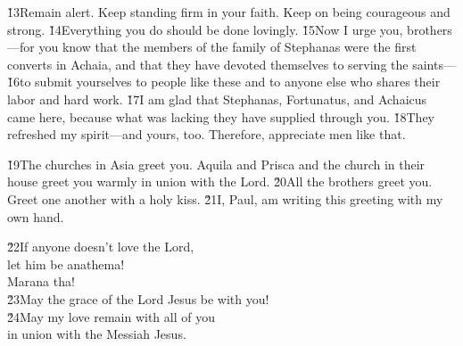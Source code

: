 \v{13}Remain alert. Keep standing firm in your faith. Keep on being courageous and strong. \v{14}Everything you do should be done lovingly. \v{15}Now I urge you, brothers---for you know that the members of the family of Stephanas were the first converts in Achaia, and that they have devoted themselves to serving the saints--- \v{16}to submit yourselves to people like these and to anyone else who shares their labor and hard work. \v{17}I am glad that Stephanas, Fortunatus, and Achaicus came here, because what was lacking they have supplied through you. \v{18}They refreshed my spirit---and yours, too. Therefore, appreciate men like that.

\v{19}The churches in Asia greet you. Aquila and Prisca and the church in their house greet you warmly in union with the Lord. \v{20}All the brothers greet you. Greet one another with a holy kiss. \v{21}I, Paul, am writing this greeting with my own hand.

\begin{poetry}
\poeml \v{22}If anyone doesn't love the Lord, \\
\poemll    let him be anathema! \\
\poemlll       Marana tha! \\
\poeml \v{23}May the grace of the Lord Jesus be with you! \\
\poeml \v{24}May my love remain with all of you \\
\poemll    in union with the Messiah Jesus.\end{poetry}
